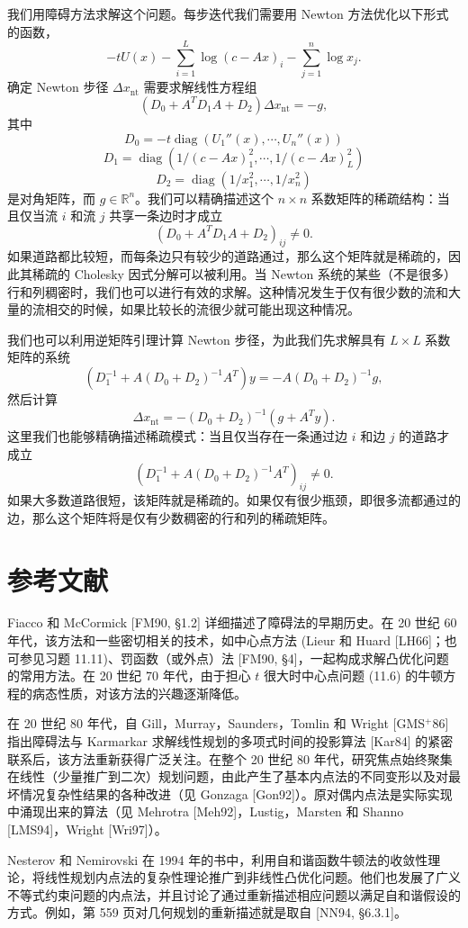 \documentclass[UTF8, 12pt, fontset=fandol, oneside]{ctexart}
\begin{document}
我们用障碍方法求解这个问题。每步迭代我们需要用 Newton 方法优化以下形式的函数，
\[
-tU(x)-\sum_{i=1}^L\log(c-Ax)_i-\sum_{j=1}^n\log x_j.
\]
确定 Newton 步径 $\Delta x_{\mathrm{nt}}$ 需要求解线性方程组
\[
(D_0+A^TD_1A+D_2)\Delta x_{\mathrm{nt}}=-g,
\]
其中
\[
D_0=-t\operatorname{diag}(U_1''(x),\cdots,U_n''(x))
\]
\[
D_1=\operatorname{diag}(1/(c-Ax)_1^2,\cdots,1/(c-Ax)_L^2)
\]
\[
D_2=\operatorname{diag}(1/x_1^2,\cdots,1/x_n^2)
\]
是对角矩阵，而 $g\in\mathbb{R}^n$。我们可以精确描述这个 $n\times n$ 系数矩阵的稀疏结构：当且仅当流 $i$ 和流 $j$ 共享一条边时才成立
\[
(D_0+A^TD_1A+D_2)_{ij}\neq 0.
\]
如果道路都比较短，而每条边只有较少的道路通过，那么这个矩阵就是稀疏的，因此其稀疏的 Cholesky 因式分解可以被利用。当 Newton 系统的某些（不是很多）行和列稠密时，我们也可以进行有效的求解。这种情况发生于仅有很少数的流和大量的流相交的时候，如果比较长的流很少就可能出现这种情况。

我们也可以利用逆矩阵引理计算 Newton 步径，为此我们先求解具有 $L\times L$ 系数矩阵的系统
\[
(D_1^{-1}+A(D_0+D_2)^{-1}A^T)y=-A(D_0+D_2)^{-1}g,
\]
然后计算
\[
\Delta x_{\mathrm{nt}}=-(D_0+D_2)^{-1}(g+A^Ty).
\]
这里我们也能够精确描述稀疏模式：当且仅当存在一条通过边 $i$ 和边 $j$ 的道路才成立
\[
(D_1^{-1}+A(D_0+D_2)^{-1}A^T)_{ij}\neq 0.
\]
如果大多数道路很短，该矩阵就是稀疏的。如果仅有很少瓶颈，即很多流都通过的边，那么这个矩阵将是仅有少数稠密的行和列的稀疏矩阵。

\section*{参考文献}

Fiacco 和 McCormick [FM90, \S1.2] 详细描述了障碍法的早期历史。在 20 世纪 60 年代，该方法和一些密切相关的技术，如中心点方法 (Lieur 和 Huard [LH66]；也可参见习题 11.11)、罚函数（或外点）法 [FM90, \S4]，一起构成求解凸优化问题的常用方法。在 20 世纪 70 年代，由于担心 $t$ 很大时中心点问题 (11.6) 的牛顿方程的病态性质，对该方法的兴趣逐渐降低。

在 20 世纪 80 年代，自 Gill，Murray，Saunders，Tomlin 和 Wright [GMS$^+$86] 指出障碍法与 Karmarkar 求解线性规划的多项式时间的投影算法 [Kar84] 的紧密联系后，该方法重新获得广泛关注。在整个 20 世纪 80 年代，研究焦点始终聚集在线性（少量推广到二次）规划问题，由此产生了基本内点法的不同变形以及对最坏情况复杂性结果的各种改进（见 Gonzaga [Gon92]）。原对偶内点法是实际实现中涌现出来的算法（见 Mehrotra [Meh92]，Lustig，Marsten 和 Shanno [LMS94]，Wright [Wri97]）。

Nesterov 和 Nemirovski 在 1994 年的书中，利用自和谐函数牛顿法的收敛性理论，将线性规划内点法的复杂性理论推广到非线性凸优化问题。他们也发展了广义不等式约束问题的内点法，并且讨论了通过重新描述相应问题以满足自和谐假设的方式。例如，第 559 页对几何规划的重新描述就是取自 [NN94, \S6.3.1]。
\end{document}
